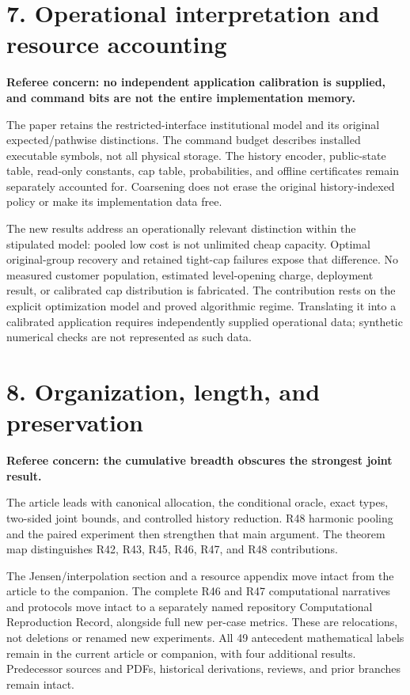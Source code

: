 \documentclass[11pt,letterpaper]{article}
\begin{document}
\section*{7. Operational interpretation and resource accounting}


\textbf{Referee concern: no independent application calibration is supplied, and command bits are not the entire implementation memory.}



The paper retains the restricted-interface institutional model and its original expected/pathwise distinctions. The command budget describes installed executable symbols, not all physical storage. The history encoder, public-state table, read-only constants, cap table, probabilities, and offline certificates remain separately accounted for. Coarsening does not erase the original history-indexed policy or make its implementation data free.



The new results address an operationally relevant distinction within the stipulated model: pooled low cost is not unlimited cheap capacity. Optimal original-group recovery and retained tight-cap failures expose that difference. No measured customer population, estimated level-opening charge, deployment result, or calibrated cap distribution is fabricated. The contribution rests on the explicit optimization model and proved algorithmic regime. Translating it into a calibrated application requires independently supplied operational data; synthetic numerical checks are not represented as such data.



\section*{8. Organization, length, and preservation}


\textbf{Referee concern: the cumulative breadth obscures the strongest joint result.}



The article leads with canonical allocation, the conditional oracle, exact types, two-sided joint bounds, and controlled history reduction. R48 harmonic pooling and the paired experiment then strengthen that main argument. The theorem map distinguishes R42, R43, R45, R46, R47, and R48 contributions.



The Jensen/interpolation section and a resource appendix move intact from the article to the companion. The complete R46 and R47 computational narratives and protocols move intact to a separately named repository Computational Reproduction Record, alongside full new per-case metrics. These are relocations, not deletions or renamed new experiments. All 49 antecedent mathematical labels remain in the current article or companion, with four additional results. Predecessor sources and PDFs, historical derivations, reviews, and prior branches remain intact.
\end{document}
